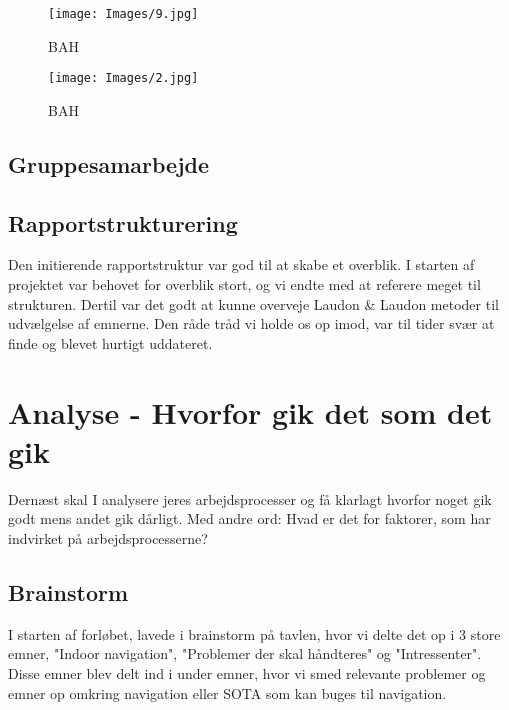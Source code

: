 \documentclass[a4paper,12pt, article]{memoir}
\begin{document}
            \begin{figure}[ht!]
                \centering
                \texttt{[image: Images/9.jpg]}
                \caption{BAH}
                \label{4}
            \end{figure}

            \begin{figure}[ht!]
                \centering
                \texttt{[image: Images/2.jpg]}
                \caption{BAH}
                \label{4}
            \end{figure}

\subsection{Gruppesamarbejde}



\subsection{Rapportstrukturering}

Den initierende rapportstruktur var god til at skabe et overblik. I starten af projektet var behovet for overblik stort, og vi endte med at referere meget til strukturen. Dertil var det godt at kunne overveje Laudon \& Laudon metoder til udvælgelse af emnerne. Den råde tråd vi holde os op imod, var til tider svær at finde og blevet hurtigt uddateret.



    

    \section{Analyse - Hvorfor gik det som det gik}
    Dernæst skal I analysere jeres arbejdsprocesser og få klarlagt hvorfor noget gik godt mens andet gik dårligt. Med andre ord: Hvad er det for faktorer, som har indvirket på arbejdsprocesserne? 

    

        \subsection{Brainstorm}
        I starten af forløbet, lavede i brainstorm på tavlen, hvor vi delte det op i 3 store  emner, "Indoor navigation", "Problemer der skal håndteres" og "Intressenter". Disse emner blev delt ind i under emner, hvor vi smed relevante problemer og emner op omkring navigation eller SOTA som kan buges til navigation. 
\end{document}
